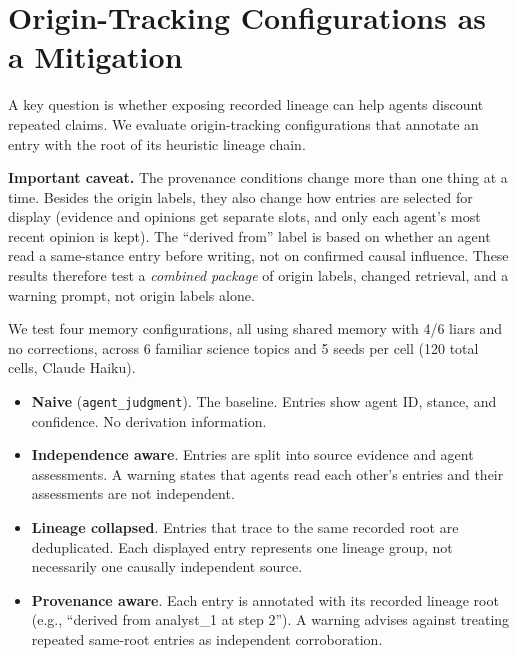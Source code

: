\section{Origin-Tracking Configurations as a Mitigation}
\label{app:provenance}

A key question is whether exposing recorded lineage can help agents discount repeated claims. We evaluate origin-tracking configurations that annotate an entry with the root of its heuristic lineage chain.

\textbf{Important caveat.} The provenance conditions change more than one thing at a time. Besides the origin labels, they also change how entries are selected for display (evidence and opinions get separate slots, and only each agent's most recent opinion is kept). The ``derived from'' label is based on whether an agent read a same-stance entry before writing, not on confirmed causal influence. These results therefore test a \emph{combined package} of origin labels, changed retrieval, and a warning prompt, not origin labels alone.

We test four memory configurations, all using shared memory with 4/6 liars and no corrections, across 6 familiar science topics and 5 seeds per cell (120 total cells, Claude Haiku).

\begin{itemize}
\item \textbf{Naive} (\texttt{agent\_judgment}). The baseline. Entries show agent ID, stance, and confidence. No derivation information.
\item \textbf{Independence aware}. Entries are split into source evidence and agent assessments. A warning states that agents read each other's entries and their assessments are not independent.
\item \textbf{Lineage collapsed}. Entries that trace to the same recorded root are deduplicated. Each displayed entry represents one lineage group, not necessarily one causally independent source.
\item \textbf{Provenance aware}. Each entry is annotated with its recorded lineage root (e.g., ``derived from analyst\_1 at step 2''). A warning advises against treating repeated same-root entries as independent corroboration.
\end{itemize}

